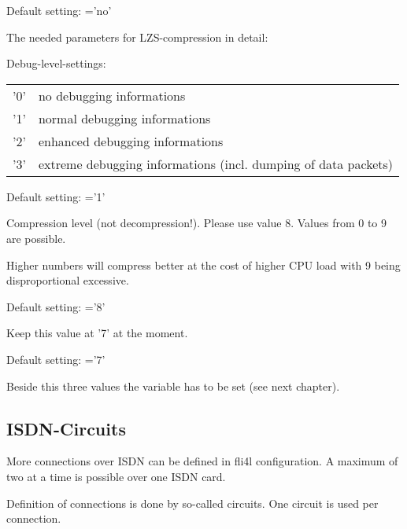 Default setting: ='no'

The needed parameters for LZS-compression in detail:

\begin{description}


  Debug-level-settings:

  \begin{tabular}[h!]{ll}
    '0' & no debugging informations \\
    '1' & normal debugging informations\\
    '2' & enhanced debugging informations\\
    '3' & extreme debugging informations (incl. dumping of data packets)\\
  \end{tabular}

  Default setting: ='1'
  
  
  Compression level (not decompression!). Please use value 8. Values from 
  0 to 9 are possible.
  
  Higher numbers will compress better at the cost of higher CPU load with 9 
  being disproportional excessive.
  
  Default setting: ='8'


  Keep this value at '7' at the moment.

  Default setting: ='7'
  
  Beside this three values the variable  
  has to be set (see next chapter).

\end{description}




\subsection{ISDN-Circuits}

More connections over ISDN can be defined in fli4l configuration. A maximum of 
two at a time is possible over one ISDN card.

Definition of connections is done by so-called circuits. One circuit is used 
per connection.


